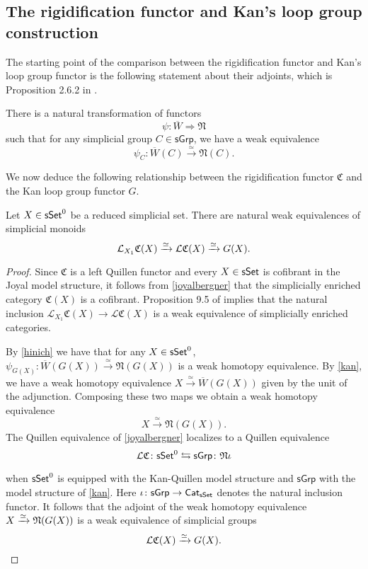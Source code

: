 \subsection{The rigidification functor and Kan's loop group construction}

The starting point of the comparison between the rigidification functor and Kan's loop group functor is the following statement about their adjoints, which is Proposition 2.6.2 in \cite{hinich2007deformation}.

\begin{proposition} \label{hinich}
	There is a natural transformation of functors $$\psi \colon \overline{W} \Longrightarrow \mathfrak{N}$$ such that for any simplicial group $C \in \mathsf{sGrp}$, we have a weak equivalence
	$$\psi_C \colon \overline{W}(C) \xrightarrow{\simeq} \mathfrak{N}(C).$$
\end{proposition} 

We now deduce the following relationship between the rigidification functor $\mathfrak{C}$ and the Kan loop group functor $G$.

\begin{proposition} \label{CandG}
	Let $X \in \mathsf{sSet}^0$ be a reduced simplicial set.
	There are natural weak equivalences of simplicial monoids
	$$\mathcal{L}_{X_1} \mathfrak{C}(X) \xrightarrow{\simeq} \mathcal{L}\mathfrak{C}(X) \xrightarrow{\simeq} G(X).$$
\end{proposition}

\begin{proof}
	Since $\mathfrak{C}$ is a left Quillen functor and every $X \in \mathsf{sSet}$ is cofibrant in the Joyal model structure, it follows from \cref{joyalbergner} that the simplicially enriched category $\mathfrak{C}(X)$ is a cofibrant.
	Proposition 9.5 of \cite{dwyer1980simplicial} implies that the natural inclusion $\mathcal{L}_{X_1} \mathfrak{C}(X) \to \mathcal{L}\mathfrak{C}(X)$ is a weak equivalence of simplicially enriched categories.
	
	By \cref{hinich} we have that for any $X \in \mathsf{sSet}^0$, $\psi_{G(X)} \colon \overline{W}(G(X)) \xrightarrow{\simeq} \mathfrak{N}(G(X))$ is a weak homotopy equivalence.
	By \cref{kan}, we have a weak homotopy equivalence $X \xrightarrow{\simeq} \overline{W}(G(X))$ given by the unit of the adjunction.
	Composing these two maps we obtain a weak homotopy equivalence
	$$X \xrightarrow{\simeq} \mathfrak{N}(G(X)).$$ 
	The Quillen equivalence of \cref{joyalbergner} localizes to a Quillen equivalence
	$$\mathcal{L} \mathfrak{C} \colon \mathsf{sSet}^0 \leftrightarrows \mathsf{sGrp} \colon \mathfrak{N} \iota$$
	
	
	when $\mathsf{sSet}^0$ is equipped with the Kan-Quillen model structure and $\mathsf{sGrp}$ with the model structure of \cref{kan}.
	Here $\iota \colon \mathsf{sGrp} \to \mathsf{Cat}_{\mathsf{sSet}}$ denotes the natural inclusion functor.
	It follows that the adjoint of the weak homotopy equivalence $X \xrightarrow{\simeq} \mathfrak{N}(G(X))$ is a weak equivalence of simplicial groups
	$$\mathcal{L}\mathfrak{C}(X) \xrightarrow{\simeq} G(X).$$ 
\end{proof}

